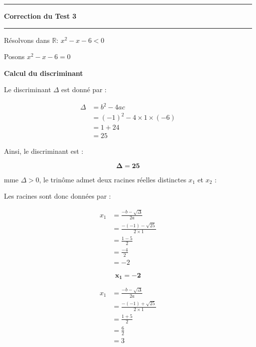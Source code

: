\documentclass[a4paper,12pt]{article}
\begin{document}
\hrule %
\begin{center}
    {\Large \textbf{Correction du Test 3}}
\end{center}
\hrule

Résolvons dans \(\mathbb{R}\): \( x^2 - x - 6 < 0\)

Posons \( x^2 - x - 6 = 0\)

\textbf{Calcul du discriminant} 
 
Le discriminant \(\Delta\) est donné par :

\[
\begin{aligned}
 \Delta &= b^2 - 4ac \\
        &= (-1)^2 - 4 \times 1 \times (-6) \\
        &= 1 + 24 \\
        &= 25
\end{aligned}
\]

Ainsi, le discriminant est : 

\begin{resultbox}
    \[
    \mathbf{\Delta = 25}
    \]
\end{resultbox}

mme \(\Delta > 0\), le trinôme admet deux racines réelles distinctes \( x_1 \) et \( x_2 \) :

Les racines sont donc données par :

\[
\begin{aligned}
        x_1 &= \frac{-b - \sqrt{\Delta}}{2a} \\
            &= \frac{-(-1) - \sqrt{25}}{2 \times 1} \\
            &= \frac{1 - 5}{2} \\
            &= \frac{-4}{2} \\
            &= -2
\end{aligned}
\]

\begin{resultbox}
    \[
    \mathbf{x_1 = -2}
    \]
\end{resultbox}

\[
\begin{aligned}
        x_1 &= \frac{-b - \sqrt{\Delta}}{2a} \\
            &= \frac{-(-1) + \sqrt{25}}{2 \times 1} \\
            &= \frac{1 + 5}{2} \\
            &= \frac{6}{2} \\
            &= 3
\end{aligned}
\]
\end{document}
